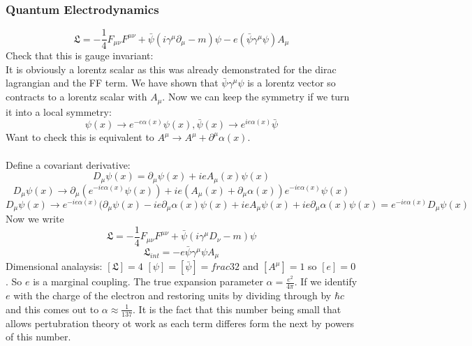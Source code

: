 \documentclass[12pt, a4paper, twoside, titlepage]{article}
\begin{document}
\begin{pmartix}
\subsubsection{Quantum Electrodynamics}
$$
\mathfrak{L} = - \frac{1}{4} F_{\mu \nu} F^{\mu \nu} + \bar \psi(i \gamma^{\mu} \partial_{\mu} - m) \psi - e( \bar \psi \gamma^{\mu} \psi) A_{\mu}
$$
Check that this is gauge invariant:\\
It is obviously a lorentz scalar as this was already demonstrated for the dirac lagrangian and the FF term. We have shown that $\bar \psi \gamma^{\mu} \psi$ is a lorentz vector so contracts to a lorentz scalar with $A_{\mu}$. Now we can keep the symmetry if we turn it into a local symmetry:
$$
\psi(x) \rightarrow e^{- e \alpha(x)} \psi(x), \bar \psi(x) \rightarrow e^{i e \alpha(x)} \bar \psi
$$
Want to check this is equivalent to $A^{\mu} \rightarrow A^{\mu} + \partial^{\mu} \alpha (x)$.\\\\
Define a covariant derivative:
$$
D_{\mu} \psi(x) = \partial_{\mu} \psi(x) + i eA_{\mu} (x) \psi(x)
$$
$$
D_{\mu} \psi(x) \rightarrow \partial_{\mu} (e^{-i e \alpha(x)} \psi(x)) + ie(A_{\mu}(x) + \partial_{\mu}\alpha(x)) e^{-ie \alpha(x)} \psi(x) 
$$
$$
D_{\mu} \psi(x) \rightarrow  e^{-ie\alpha(x)} (\partial_{\mu} \psi(x) - ie \partial_{\mu} \alpha(x) \psi(x) + ie A_{\mu} \psi(x) + i e \partial_{\mu} \alpha(x) \psi(x) = e^{- ie \alpha(x)} D_{\mu} \psi(x)
$$
Now we write
$$
\mathfrak{L} = - \frac{1}{4} F_{\mu \nu} F^{\mu \nu} + \bar \psi( i \gamma^{\mu} D_{\nu} - m ) \psi
$$
$$
\mathfrak{L}_{int} = -e \bar \psi \gamma^{\mu} \psi A_{\mu}
$$
Dimensional analaysis: $[\mathfrak{L}] =4$ $[\psi]=[\bar \psi] = frac{3}{2}$ and $[A^{\mu}] =1$ so $[e] = 0$. So $e$ is a marginal coupling. The true expansion parameter $\alpha = \frac{e^2}{4\pi}$. If we identify $e$ with the charge of the electron and restoring units by dividing through by $\hbar c$ and this comes out to $\alpha \approx \frac{1}{137}$. It is the fact that this number being small that allows pertubration theory ot work as each term differes form the next by powers of this number.

\end{pmartix}
\end{document}
